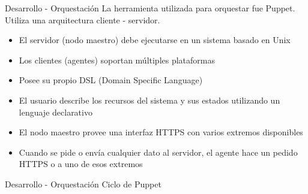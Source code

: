 \begin{frame}{Desarrollo - Orquestación}
    \vspace{-1.5cm}
    La herramienta utilizada para orquestar fue Puppet.
    \\
    Utiliza una arquitectura cliente - servidor.  
    \begin{itemize}
        \item El servidor (nodo maestro) debe ejecutarse en un sistema basado en Unix
        \item Los clientes (agentes) soportan múltiples plataformas
        \item Posee su propio DSL (Domain Specific Language)
        \item El usuario describe los recursos del sistema y sus estados utilizando un lenguaje declarativo  
        \item El nodo maestro provee una interfaz HTTPS con varios extremos disponibles
        \item Cuando se pide o envía cualquier dato al servidor, el agente hace un pedido HTTPS o a uno de esos extremos
    \end{itemize}

\end{frame}


\begin{frame}{Desarrollo - Orquestación}
    \vspace{0cm} {Ciclo de Puppet}
    \vspace{0cm}
        \begin{figure}[ht]
           \centering
        \end{figure}

\end{frame}

